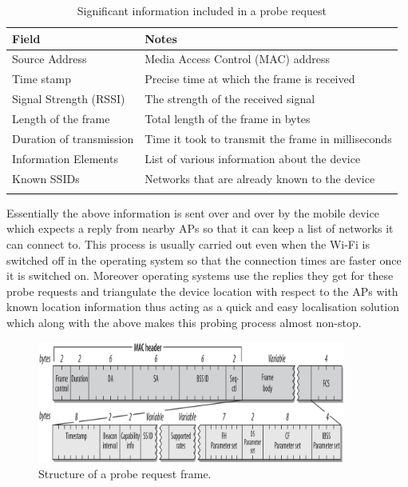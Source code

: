 \begin{table}
  \footnotesize
  \begin{center}
    \begin{tabular}{lp{6.5cm}}
      \toprule
        Field & Notes\\
      \midrule
        \addlinespace[0.2cm]
        Source Address & Media Access Control (MAC) address\\
        \addlinespace[0.2cm]
        Time stamp & Precise time at which the frame is received\\
        \addlinespace[0.2cm]
        Signal Strength (RSSI) & The strength of the received signal\\
        \addlinespace[0.2cm]
        Length of the frame & Total length of the frame in bytes\\
        \addlinespace[0.2cm]
        Duration of transmission & Time it took to transmit the frame in milliseconds\\
        \addlinespace[0.2cm]
        Information Elements & List of various information about the device\\
        \addlinespace[0.2cm]
        Known SSIDs & Networks that are already known to the device\\
        \addlinespace[0.1cm]
      \bottomrule
    \end{tabular}
  \end{center}
  \caption{Significant information included in a probe request}
  \label{table:collection:proberequest}
\end{table}

Essentially the above information is sent over and over by the mobile device which expects a reply from nearby APs so that it can keep a list of networks it can connect to.
This process is usually carried out even when the Wi-Fi is switched off in the operating system so that the connection times are faster once it is switched on.
Moreover operating systems use the replies they get for these probe requests and triangulate the device location with respect to the APs with known location information thus acting as a quick and easy localisation solution which along with the above makes this probing process almost non-stop. 

\begin{figure}
  \includegraphics[width=0.9\textwidth,trim={0 -30 0 -10},clip]{images/probe-request-structure.png}
  \caption{Structure of a probe request frame. }
  \label{figure:collection:proberequest}
\end{figure}

